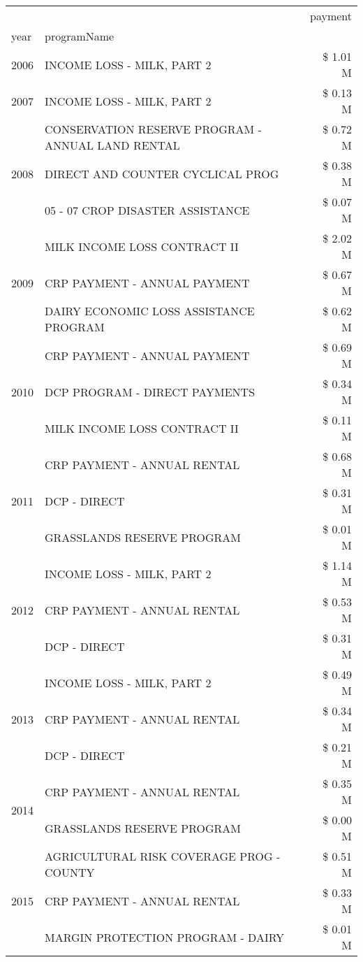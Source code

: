 \begin{tabular}{llr}
\toprule
 &  & payment \\
year & programName &  \\
\midrule
2006 & INCOME LOSS - MILK, PART 2 & \$ 1.01 M \\
\cline{1-3}
2007 & INCOME LOSS - MILK, PART 2 & \$ 0.13 M \\
\cline{1-3}
\multirow[t]{3}{*}{2008} & CONSERVATION RESERVE PROGRAM - ANNUAL LAND RENTAL & \$ 0.72 M \\
 & DIRECT AND COUNTER CYCLICAL PROG & \$ 0.38 M \\
 & 05 - 07 CROP DISASTER ASSISTANCE & \$ 0.07 M \\
\cline{1-3}
\multirow[t]{3}{*}{2009} & MILK INCOME LOSS CONTRACT II & \$ 2.02 M \\
 & CRP PAYMENT - ANNUAL PAYMENT & \$ 0.67 M \\
 & DAIRY ECONOMIC LOSS ASSISTANCE PROGRAM & \$ 0.62 M \\
\cline{1-3}
\multirow[t]{3}{*}{2010} & CRP PAYMENT - ANNUAL PAYMENT & \$ 0.69 M \\
 & DCP PROGRAM - DIRECT PAYMENTS & \$ 0.34 M \\
 & MILK INCOME LOSS CONTRACT II & \$ 0.11 M \\
\cline{1-3}
\multirow[t]{3}{*}{2011} & CRP PAYMENT - ANNUAL RENTAL & \$ 0.68 M \\
 & DCP - DIRECT & \$ 0.31 M \\
 & GRASSLANDS RESERVE PROGRAM & \$ 0.01 M \\
\cline{1-3}
\multirow[t]{3}{*}{2012} & INCOME LOSS - MILK, PART 2 & \$ 1.14 M \\
 & CRP PAYMENT - ANNUAL RENTAL & \$ 0.53 M \\
 & DCP - DIRECT & \$ 0.31 M \\
\cline{1-3}
\multirow[t]{3}{*}{2013} & INCOME LOSS - MILK, PART 2 & \$ 0.49 M \\
 & CRP PAYMENT - ANNUAL RENTAL & \$ 0.34 M \\
 & DCP - DIRECT & \$ 0.21 M \\
\cline{1-3}
\multirow[t]{2}{*}{2014} & CRP PAYMENT - ANNUAL RENTAL & \$ 0.35 M \\
 & GRASSLANDS RESERVE PROGRAM & \$ 0.00 M \\
\cline{1-3}
\multirow[t]{3}{*}{2015} & AGRICULTURAL RISK COVERAGE PROG - COUNTY & \$ 0.51 M \\
 & CRP PAYMENT - ANNUAL RENTAL & \$ 0.33 M \\
 & MARGIN PROTECTION PROGRAM - DAIRY & \$ 0.01 M \\

\end{tabular}
